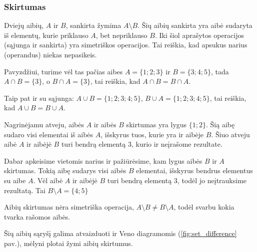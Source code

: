 \documentclass[a4paper]{article}
\begin{document}
\subsubsection{Skirtumas}

Dviejų aibių, $A$ ir $B$, sankirta žymima $A \setminus B$. Šių aibių sankirta
yra aibė sudaryta iš elementų, kurie priklauso $A$, bet nepriklauso $B$. Iki
šiol aprašytos operacijos (sąjunga ir sankirta) yra simetriškos operacijos. Tai
reiškia, kad apsukus narius (operandus) niekas nepasikeis.

Pavyzdžiui, turime vėl tas pačias aibes $A=\{1;2;3\}$ ir  $B=\{3;4;5\}$, tada
$A \cap B = \{3\}$, o $B \cap A = \{3\}$, tai reiškia, kad $ A \cap B = B \cap
      A $.

Taip pat ir su sąjunga: $A \cup B = \{1;2;3;4;5\}$, $B \cup A = \{1;2;3;4;5\}$,
tai reiškia, kad $ A \cup B = B \cup A $.

Nagrinėjamu atveju, aibės $A$ ir aibės $B$ skirtumas yra lygus $\{1;2\}$. Šią
aibę sudaro visi elementai iš aibės $A$, išskyrus tuos, kurie yra ir aibėje
$B$. Šiuo atveju aibė $A$ ir aibėjė $B$ turi bendrą elementą $3$, kurio ir
neįrašome rezultate.

Dabar apkeisime vietomis narius ir pažiūrėsime, kam lygus aibės $B$ ir $A$
skirtumas. Tokią aibę sudarys visi aibės $B$ elementai, išskyrus bendrus
elementus su aibe $A$. Vėl aibė $A$ ir aibėjė $B$ turi bendrą elementą $3$,
todėl jo neįtrauksime rezultatą. Tai $B \setminus A = \{4;5\}$

Aibių skirtumas nėra simetriška operacija, $A \setminus B \neq B \setminus A$,
todėl svarbu kokia tvarka rašomos aibės.

Šių aibių sąryšį galima atvaizduoti ir Veno diagramomis
(\ref{fig:set_difference} pav.), mėlyni plotai žymi aibių skirtumus.
\end{document}
